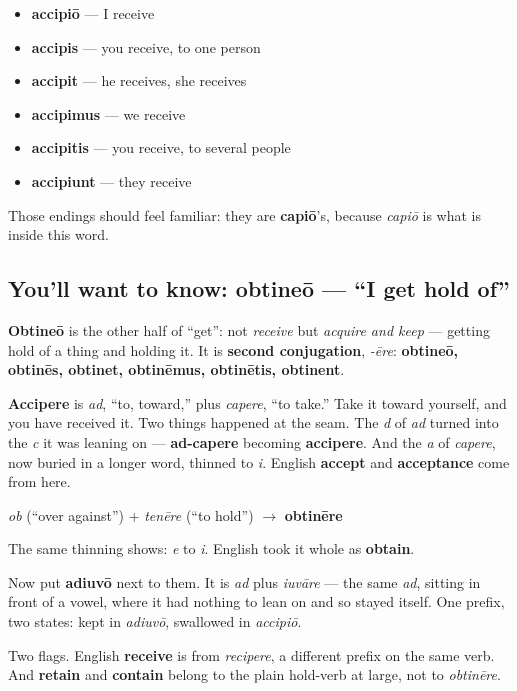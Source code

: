 \begin{itemize}
\raggedright
  \item \textbf{accipiō} — I receive
  \item \textbf{accipis} — you receive, to one person
  \item \textbf{accipit} — he receives, she receives
  \item \textbf{accipimus} — we receive
  \item \textbf{accipitis} — you receive, to several people
  \item \textbf{accipiunt} — they receive
\end{itemize}

Those endings should feel familiar: they are \textbf{capiō}'s, because \emph{capiō} is what is inside this word.

\subsection*{You'll want to know: obtineō — \textquotedblleft{}I get hold of\textquotedblright{}}
\textbf{Obtineō} is the other half of \textquotedblleft{}get\textquotedblright{}: not \emph{receive} but \emph{acquire and keep} — getting hold of a thing and holding it. It is \textbf{second conjugation}, \emph{-ēre}: \textbf{obtineō, obtinēs, obtinet, obtinēmus, obtinētis, obtinent}.

\begin{cousinweb}
\textbf{Accipere} is \emph{ad}, \textquotedblleft{}to, toward,\textquotedblright{} plus \emph{capere}, \textquotedblleft{}to take.\textquotedblright{} Take it toward yourself, and you have received it. Two things happened at the seam. The \emph{d} of \emph{ad} turned into the \emph{c} it was leaning on — \textbf{ad-capere} becoming \textbf{accipere}. And the \emph{a} of \emph{capere}, now buried in a longer word, thinned to \emph{i}. English \textbf{accept} and \textbf{acceptance} come from here.

\emph{ob} (\textquotedblleft{}over against\textquotedblright{}) + \emph{tenēre} (\textquotedblleft{}to hold\textquotedblright{}) $\to$ \textbf{obtinēre}

The same thinning shows: \emph{e} to \emph{i}. English took it whole as \textbf{obtain}.

Now put \textbf{adiuvō} next to them. It is \emph{ad} plus \emph{iuvāre} — the same \emph{ad}, sitting in front of a vowel, where it had nothing to lean on and so stayed itself. One prefix, two states: kept in \emph{adiuvō}, swallowed in \emph{accipiō}.

Two flags. English \textbf{receive} is from \emph{recipere}, a different prefix on the same verb. And \textbf{retain} and \textbf{contain} belong to the plain hold-verb at large, not to \emph{obtinēre}.
\end{cousinweb}

